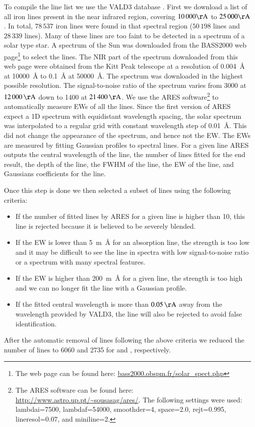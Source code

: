 \documentclass{aa}
\begin{document}
To compile the line list we use the VALD3 database \citep{VALD1,VALD2}.
First we download a list of all iron lines present in the near infrared
region, covering $10\,000\si{\AA}$ to $25\,000\si{\AA}$. In
total, $78\,537$ iron lines were found in that spectral region
($50\,198$  lines and $28\,339$  lines).
Many of these lines are too faint to be detected in a spectrum
of a solar type star. A spectrum of the Sun was downloaded from
the BASS2000 web page\footnote{The web page can be found here:
\url{bass2000.obspm.fr/solar_spect.php}} to select the lines. The
NIR part of the spectrum downloaded from this web page were obtained
from the Kitt Peak telescope \citep{Hinkle1995} at a resolution of
\SI{0.004}{\angstrom} at \SI{10000}{\angstrom} to \SI{0.1}{\angstrom}
at \SI{50000}{\angstrom}. The spectrum was downloaded in the highest
possible resolution. The signal-to-noise ratio of the spectrum varies
from 3000 at $\SI{12000}{\AA}$ down to 1400 at $\SI{21400}{\AA}$. We
use the ARES software\footnote{The ARES software can be found here:
\url{http://www.astro.up.pt/~sousasag/ares/}. The following settings were used:
lambdai=7500, lambdaf=54000, smoothder=4, space=2.0, rejt=0.995, lineresol=0.07,
and miniline=2.}\citep{Sousa2007,Sousa2015a}
to automatically measure EWs of all the lines. Since the first version
of ARES expect a 1D spectrum with equidistant wavelength spacing,
the solar spectrum was interpolated to a regular grid with constant
wavelength step of \SI{0.01}{\angstrom}. This did not change the appearance
of the spectrum, and hence not the EW.
The EWs are measured by fitting
Gaussian profiles to spectral lines. For a given line ARES outputs the
central wavelength of the line, the number of lines fitted for the end
result, the depth of the line, the FWHM of the line, the EW of the line,
and Gaussians coefficients for the line.

Once this step is done we then selected a subset of lines using the
following criteria:
\begin{itemize}
    \item If the number of fitted lines by ARES for a given line is higher than 10,
        this line is rejected because it is believed to be severely blended.
    \item If the EW is lower than \SI{5}{m\angstrom} for an absorption line, the strength
        is too low and it may be difficult to see the line in spectra with low
        signal-to-noise ratio or a spectrum with many spectral features.
    \item If the EW is higher than \SI{200}{m\angstrom} for a given line, the strength
        is too high and we can no longer fit the line with a Gaussian profile.
    \item If the fitted central wavelength is more than $\SI{0.05}{\AA}$ away
        from the wavelength provided by VALD3, the line will also be rejected to
        avoid false identification.
\end{itemize}
After the automatic removal of lines following the above criteria
we reduced the number of lines to 6060 and 2735 for  and
, respectively.
\end{document}
